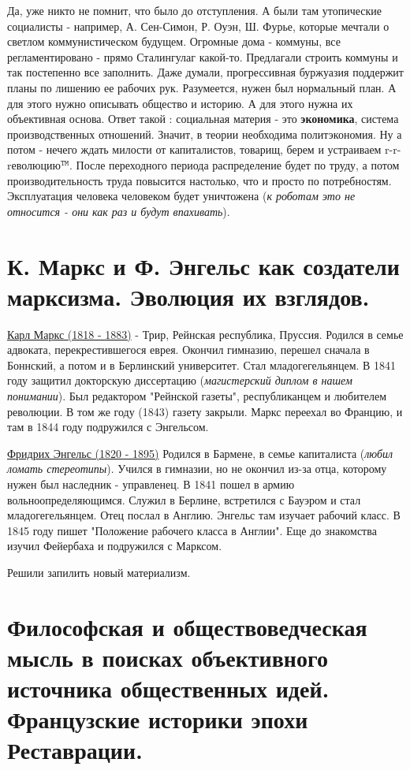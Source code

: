 Да, уже никто не помнит, что было до отступления. А были там утопические социалисты - например, А. Сен-Симон, Р. Оуэн, Ш. Фурье, которые мечтали о светлом коммунистическом будущем. Огромные дома - коммуны, все регламентировано - прямо Сталингулаг какой-то. Предлагали строить коммуны и так постепенно все заполнить. Даже думали, прогрессивная буржуазия поддержит планы по лишению ее рабочих рук. Разумеется, нужен был нормальный план. А для этого нужно описывать общество и историю. А для этого нужна их объективная основа. Ответ такой : социальная материя - это \textbf{экономика}, система производственных отношений. Значит, в теории необходима политэкономия. Ну а потом - нечего ждать милости от капиталистов, товарищ, берем и устраиваем r-r-rеволюцию${}^\mathtt{TM}$. После переходного периода распределение будет по труду, а потом производительность труда повысится настолько, что и просто по потребностям. Эксплуатация человека человеком будет уничтожена (\textit{к роботам это не относится - они как раз и будут впахивать}). 

\section{К. Маркс и Ф. Энгельс как создатели марксизма. Эволюция их взглядов.}
\underline{Карл Маркс (1818 - 1883)} - Трир, Рейнская республика, Пруссия. Родился в семье адвоката, перекрестившегося еврея. Окончил гимназию, перешел сначала в Боннский, а потом и в Берлинский университет. Стал младогегельянцем. В 1841 году защитил докторскую диссертацию (\textit{магистерский диплом в нашем понимании}). Был редактором "Рейнской газеты", республиканцем и любителем революции. В том же году (1843) газету закрыли. Маркс переехал во Францию, и там в 1844 году подружился с Энгельсом.
 
\underline{Фридрих Энгельс (1820 - 1895)} Родился в Бармене, в семье капиталиста (\textit{любил ломать стереотипы}). Учился в гимназии, но не окончил из-за отца, которому нужен был наследник - управленец. В 1841 пошел в армию вольноопределяющимся. Служил в Берлине, встретился с Бауэром и стал младогегельянцем. Отец послал в Англию. Энгельс там изучает рабочий класс. В 1845 году пишет "Положение рабочего класса в Англии". Еще до знакомства изучил Фейербаха и подружился с Марксом. 

Решили запилить новый материализм.

\section{Философская и обществоведческая мысль в поисках объективного источника общественных идей. Французские историки эпохи Реставрации.}
